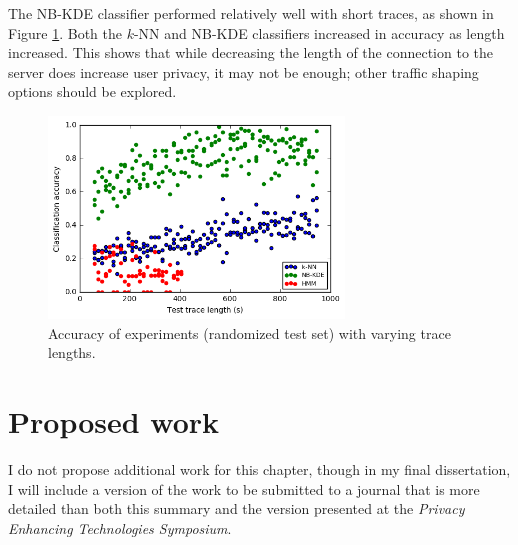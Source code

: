 The NB-KDE classifier performed relatively well with short traces, as shown in Figure \ref{fig:tputlen}. Both the $k$-NN and NB-KDE classifiers increased in accuracy as length increased. This shows that while decreasing the length of the connection to the server does increase user privacy, it may not be enough; other traffic shaping options should be explored. 

\begin{figure}
	\centering
	\includegraphics[width=0.7\textwidth]{graphics/tputlength}
	\caption{Accuracy of experiments (randomized test set) with varying trace lengths.}
	\label{fig:tputlen}
\end{figure}

\section{Proposed work}
I do not propose additional work for this chapter, though in my final dissertation, I will include a version of the work to be submitted to a journal that is more detailed than both this summary and the version presented at the \emph{Privacy Enhancing Technologies Symposium}.
%
